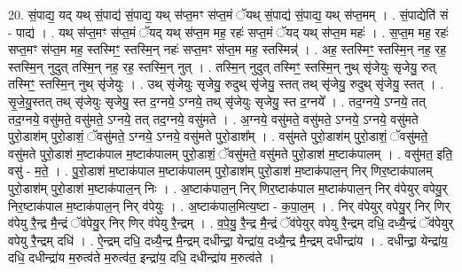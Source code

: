 \documentclass[17pt]{extarticle}
\begin{document}
20. सं॒पाद्य॒ यद् यथ् सं॒पाद्य॑ सं॒पाद्य॒ यथ् स॑प्त॒मꣳ स॑प्त॒मं ॅयथ् सं॒पाद्य॑ सं॒पाद्य॒ यथ् स॑प्त॒मम् । . सं॒पाद्येति॑ सं - पाद्य॑ । . यथ् स॑प्त॒मꣳ स॑प्त॒मं ॅयद् यथ् स॑प्त॒म मह॒ रहः॑ सप्त॒मं ॅयद् यथ् स॑प्त॒म महः॑ । . स॒प्त॒म मह॒ रहः॑ सप्त॒मꣳ स॑प्त॒म मह॒ स्तस्मिꣳ॒॒ स्तस्मि॒न् नहः॑ सप्त॒मꣳ स॑प्त॒म मह॒ स्तस्मिन्न्॑ । . अह॒ स्तस्मिꣳ॒॒ स्तस्मि॒न् नह॒ रह॒ स्तस्मि॒न् नुदुत् तस्मि॒न् नह॒ रह॒ स्तस्मि॒न् नुत् । . तस्मि॒न् नुदुत् तस्मिꣳ॒॒ स्तस्मि॒न् नुथ् सृ॑जेयुः सृजेयु॒ रुत् तस्मिꣳ॒॒ स्तस्मि॒न् नुथ् सृ॑जेयुः । . उथ् सृ॑जेयुः सृजेयु॒ रुदुथ् सृ॑जेयु॒ स्तत् तथ् सृ॑जेयु॒ रुदुथ् सृ॑जेयु॒ स्तत् । . सृ॒जे॒यु॒स्तत् तथ् सृ॑जेयुः सृजेयु॒ स्त द॒ग्नये॒ ऽग्नये॒ तथ् सृ॑जेयुः सृजेयु॒ स्त द॒ग्नये᳚ । . तद॒ग्नये॒ ऽग्नये॒ तत् तद॒ग्नये॒ वसु॑मते॒ वसु॑मते॒ ऽग्नये॒ तत् तद॒ग्नये॒ वसु॑मते । . अ॒ग्नये॒ वसु॑मते॒ वसु॑मते॒ ऽग्नये॒ ऽग्नये॒ वसु॑मते पुरो॒डाश॑म् पुरो॒डाशं॒ ॅवसु॑मते॒ ऽग्नये॒ ऽग्नये॒ वसु॑मते पुरो॒डाश᳚म् । . वसु॑मते पुरो॒डाश॑म् पुरो॒डाशं॒ ॅवसु॑मते॒ वसु॑मते पुरो॒डाश॑ म॒ष्टाक॑पाल म॒ष्टाक॑पालम् पुरो॒डाशं॒ ॅवसु॑मते॒ वसु॑मते पुरो॒डाश॑ म॒ष्टाक॑पालम् । . वसु॑मत॒ इति॒ वसु॑ - म॒ते॒ । . पु॒रो॒डाश॑ म॒ष्टाक॑पाल म॒ष्टाक॑पालम् पुरो॒डाश॑म् पुरो॒डाश॑ म॒ष्टाक॑पाल॒न् निर् णिर॒ष्टाक॑पालम् पुरो॒डाश॑म् पुरो॒डाश॑ म॒ष्टाक॑पाल॒न् निः । . अ॒ष्टाक॑पाल॒न् निर् णिर॒ष्टाक॑पाल म॒ष्टाक॑पाल॒न् निर् व॑पेयुर् वपेयु॒र् निर॒ष्टाक॑पाल म॒ष्टाक॑पाल॒न् निर् व॑पेयुः । . अ॒ष्टाक॑पाल॒मित्य॒ष्टा - क॒पा॒ल॒म् । . निर् व॑पेयुर् वपेयु॒र् निर् णिर् व॑पेयु रै॒न्द्र मै॒न्द्रं ॅव॑पेयु॒र् निर् णिर् व॑पेयु रै॒न्द्रम् । . व॒पे॒यु॒ रै॒न्द्र मै॒न्द्रं ॅव॑पेयुर् वपेयु रै॒न्द्रम् दधि॒ दध्यै॒न्द्रं ॅव॑पेयुर् वपेयु रै॒न्द्रम् दधि॑ । . ऐ॒न्द्रम् दधि॒ दध्यै॒न्द्र मै॒न्द्रम् दधीन्द्रा॒ येन्द्रा॑य॒ दध्यै॒न्द्र मै॒न्द्रम् दधीन्द्रा॑य । . दधीन्द्रा॒ येन्द्रा॑य॒ दधि॒ दधीन्द्रा॑य म॒रुत्व॑ते म॒रुत्व॑त॒ इन्द्रा॑य॒ दधि॒ दधीन्द्रा॑य म॒रुत्व॑ते । \newline
\end{document}
